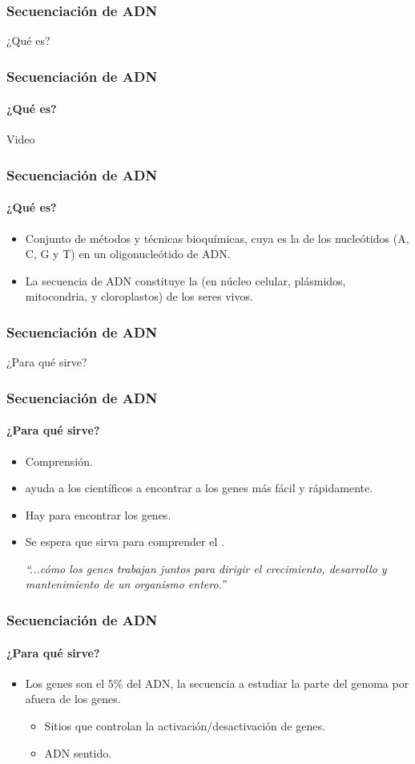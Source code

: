 \frame
{
\frametitle{Secuenciación de ADN}
\begin{center}
	\huge{¿Qué es?}
\end{center}
}

\frame
{
\frametitle{Secuenciación de ADN}
\framesubtitle{¿Qué es?}
\begin{center}
	\huge{Video}
\end{center}
}


\frame
{
\frametitle{Secuenciación de ADN}
\framesubtitle{¿Qué es?}
\begin{itemize}
	\item Conjunto de métodos y técnicas bioquímicas,
		cuya  es la  de los nucleótidos (A, C, G y T) en un oligonucleótido de ADN.
	\item La secuencia de ADN constituye la  (en núcleo celular, plásmidos, mitocondria,
		y cloroplastos)  de los seres vivos.
\end{itemize}
}


\frame
{
\frametitle{Secuenciación de ADN}
\begin{center}
	\huge{¿Para qué sirve?}
\end{center}
}
\frame
{
\frametitle{Secuenciación de ADN}
\framesubtitle{¿Para qué sirve?}
\begin{itemize}
	\item Comprensión.
	\item {} ayuda a los científicos a encontrar a los genes más fácil y rápidamente.
	\item Hay  para encontrar los genes.
	\item Se espera que sirva para comprender el .\\

	\begin{center}
	\emph{``...cómo los genes trabajan juntos para dirigir el crecimiento,
		desarrollo y mantenimiento de un organismo entero.''}
	\end{center}
\end{itemize}
}

\frame
{
\frametitle{Secuenciación de ADN}
\framesubtitle{¿Para qué sirve?}
\begin{itemize}
	\item Los genes son el $5\%$ del ADN, la secuencia  a estudiar
		la parte del genoma por afuera de los genes.
	\begin{itemize}
		\item Sitios  que controlan la activación/desactivación de genes.
		\item ADN  sentido.
	\end{itemize}
\end{itemize}
}


